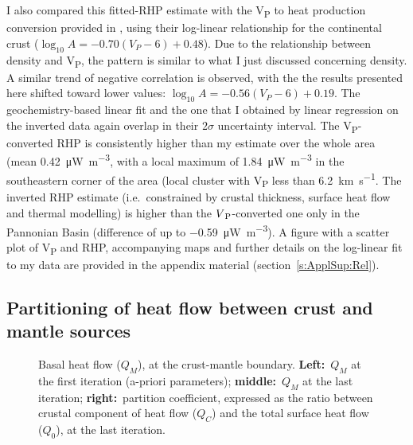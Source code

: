 I also compared this fitted-RHP estimate with the V\textsubscript{P} to heat production conversion provided in \textcite{Hasterok2017_ign}, using their log-linear relationship for the continental crust ($\log_{10} A = -0.70 (V_{P} - 6) + 0.48$).
Due to the relationship between density and V\textsubscript{P}, the pattern is similar to what I just discussed concerning density. A similar trend of negative correlation is observed, with the the results presented here shifted toward lower values: $\log_{10} A = -0.56 (V_{P} - 6) + 0.19$.
The geochemistry-based linear fit and the one that I obtained by linear regression on the inverted data again overlap in their $2\sigma$ uncertainty interval.
The V\textsubscript{P}-converted RHP is consistently higher than my estimate over the whole area (mean \SI[retain-explicit-plus]{+0.42}{\micro \watt \per \cubic \metre}, with a local maximum of \SI[retain-explicit-plus]{+1.84}{\micro \watt \per \cubic \metre} in the southeastern corner of the area (local cluster with V\textsubscript{P} less than \SI{6.2}{\kilo \metre \per \second}.
The inverted RHP estimate (i.e.~constrained by crustal thickness, surface heat flow and thermal modelling) is higher than the $V\textsubscript{P}$-converted one only in the Pannonian Basin (difference of up to \SI{-0.59}{\micro \watt \per \cubic \metre}).
A figure with a scatter plot of V\textsubscript{P} and RHP, accompanying maps and further details on the log-linear fit to my data are provided in the appendix material (section~\ref{s:ApplSup:Rel}).

\subsection{Partitioning of heat flow between crust and mantle sources}
\label{ss:Appl:DiscTherm:Partition}

\begin{figure}
	\begin{adjustbox}{center}
	\end{adjustbox}
	\caption[Basal heat flow at the crust-mantle boundary.]{Basal heat flow ($Q_M$), at the crust-mantle boundary. \textbf{Left:}~$Q_M$ at the first iteration (a-priori parameters); \textbf{middle:}~$Q_M$ at the last iteration; \textbf{right:}~partition coefficient, expressed as the ratio between crustal component of heat flow ($Q_C$) and the total surface heat flow ($Q_0$), at the last iteration.}
	\label{fig:QM}
\end{figure}

